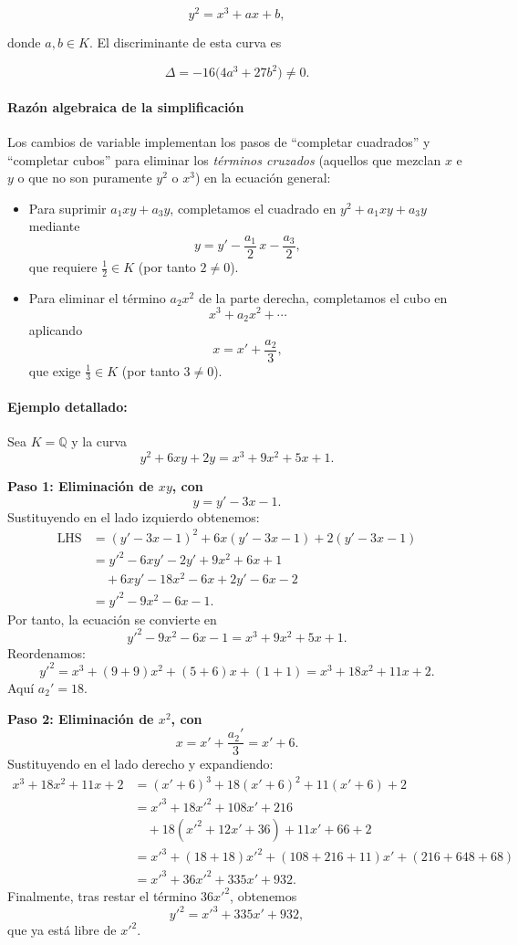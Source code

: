 \begin{equation}\label{eq:weierstrass_simple}
y^2 = x^3 + a x + b,
\end{equation}

donde $a,b\in K$. El discriminante de esta curva es

\[
\Delta = -16\bigl(4a^3 + 27b^2\bigr)\neq0.
\]

\paragraph{Razón algebraica de la simplificación}
Los cambios de variable implementan los pasos de ``completar cuadrados'' y ``completar cubos'' para eliminar los \emph{términos cruzados} (aquellos que mezclan $x$ e $y$ o que no son puramente $y^2$ o $x^3$) en la ecuación general:

\begin{itemize}
  \item Para suprimir $a_1xy + a_3y$, completamos el cuadrado en $y^2 + a_1xy + a_3y$ mediante
    \[
      y = y' - \frac{a_1}{2}\,x - \frac{a_3}{2},
    \]
    que requiere $\tfrac12\in K$ (por tanto $2\neq0$).
  \item Para eliminar el término $a_2x^2$ de la parte derecha, completamos el cubo en
    \[
      x^3 + a_2x^2 + \cdots
    \]
    aplicando
    \[
      x = x' + \frac{a_2}{3},
    \]
    que exige $\tfrac13\in K$ (por tanto $3\neq0$).
\end{itemize}

\paragraph{Ejemplo detallado:}
Sea $K=\mathbb{Q}$ y la curva
$$
y^2 + 6xy + 2y = x^3 + 9x^2 + 5x + 1.
$$

\textbf{Paso 1: Eliminación de $xy$, con}
$$
y = y' - 3x - 1.
$$
Sustituyendo en el lado izquierdo obtenemos:
$$
\begin{aligned}
\text{LHS} &= (y' - 3x - 1)^2 + 6x(y' - 3x - 1) + 2(y' - 3x - 1)\\
&= y'^2 -6xy' -2y' +9x^2 +6x +1\\
&\quad +6xy' -18x^2 -6x +2y' -6x -2\\
&= y'^2 -9x^2 -6x -1.
\end{aligned}
$$
Por tanto, la ecuación se convierte en
$$
y'^2 -9x^2 -6x -1 = x^3 +9x^2 +5x +1.
$$
Reordenamos:
$$
y'^2 = x^3 + (9+9)x^2 + (5+6)x + (1+1) = x^3 + 18x^2 +11x +2.
$$
Aquí $a_2' = 18$.

\textbf{Paso 2: Eliminación de $x^2$, con}
$$
x = x' + \frac{a_2'}{3} = x' + 6.
$$
Sustituyendo en el lado derecho y expandiendo:
$$
\begin{aligned}
x^3 + 18x^2 + 11x + 2 &= (x'+6)^3 + 18(x'+6)^2 + 11(x'+6) + 2\\
&= x'^3 + 18x'^2 + 108x' +216 \\ 
&\quad +18(x'^2+12x'+36) +11x' +66 +2\\
&= x'^3 + (18+18)x'^2 + (108+216+11)x' + (216+648+68)\\
&= x'^3 + 36x'^2 + 335x' + 932.
\end{aligned}
$$
Finalmente, tras restar el término $36x'^2$, obtenemos
$$
y'^2 = x'^3 + 335x' + 932,
$$
que ya está libre de $x'^2$.

